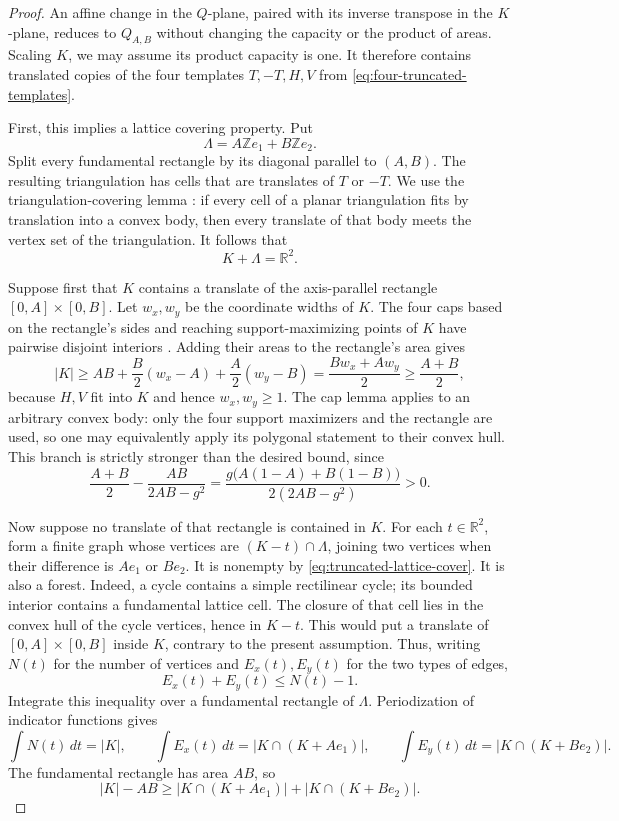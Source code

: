 \begin{proof}
An affine change in the $Q$-plane, paired with its inverse transpose in
the $K$-plane, reduces to $Q_{A,B}$ without changing the capacity or the
product of areas. Scaling $K$, we may assume its product capacity is one.
It therefore contains translated copies of the four templates
$T,-T,H,V$ from \eqref{eq:four-truncated-templates}.

First, this implies a lattice covering property. Put
\[
 \Lambda=A\mathbb Z e_1+B\mathbb Z e_2.
\]
Split every fundamental rectangle by its diagonal parallel to $(A,B)$.
The resulting triangulation has cells that are translates of $T$ or $-T$.
We use the triangulation-covering lemma
\cite[Lemma~4.3]{BMP2026}: if every cell of a planar triangulation fits by
translation into a convex body, then every translate of that body meets
the vertex set of the triangulation. It follows that
\begin{equation}\label{eq:truncated-lattice-cover}
 K+\Lambda=\mathbb R^2.
\end{equation}

Suppose first that $K$ contains a translate of the axis-parallel rectangle
$[0,A]\times[0,B]$. Let $w_x,w_y$ be the coordinate widths of $K$.
The four caps based on the rectangle's sides and reaching support-maximizing
points of $K$ have pairwise disjoint interiors
\cite[Lemma~7.1]{BMP2026}. Adding their areas to the rectangle's area gives
\[
 |K|\geq AB+\frac B2(w_x-A)+\frac A2(w_y-B)
       =\frac{Bw_x+Aw_y}{2}\geq\frac{A+B}{2},
\]
because $H,V$ fit into $K$ and hence $w_x,w_y\geq1$.
The cap lemma applies to an arbitrary convex body: only the four support
maximizers and the rectangle are used, so one may equivalently apply its
polygonal statement to their convex hull. This branch is strictly stronger
than the desired bound, since
\[
 \frac{A+B}{2}-\frac{AB}{2AB-g^2}
 =\frac{g\bigl(A(1-A)+B(1-B)\bigr)}{2(2AB-g^2)}>0.
\]

Now suppose no translate of that rectangle is contained in $K$.
For each $t\in\mathbb R^2$, form a finite graph whose vertices are
$(K-t)\cap\Lambda$, joining two vertices when their difference is
$Ae_1$ or $Be_2$. It is nonempty by \eqref{eq:truncated-lattice-cover}.
It is also a forest. Indeed, a cycle contains a simple rectilinear cycle;
its bounded interior contains a fundamental lattice cell. The closure of
that cell lies in the convex hull of the cycle vertices, hence in $K-t$.
This would put a translate of $[0,A]\times[0,B]$ inside $K$, contrary
to the present assumption. Thus, writing $N(t)$ for the number of vertices
and $E_x(t),E_y(t)$ for the two types of edges,
\[
 E_x(t)+E_y(t)\leq N(t)-1.
\]
Integrate this inequality over a fundamental rectangle of $\Lambda$.
Periodization of indicator functions gives
\[
 \int N(t)\,dt=|K|,\qquad
 \int E_x(t)\,dt=|K\cap(K+Ae_1)|,\qquad
 \int E_y(t)\,dt=|K\cap(K+Be_2)|.
\]
The fundamental rectangle has area $AB$, so
\begin{equation}\label{eq:forest-overlap}
 |K|-AB\geq |K\cap(K+Ae_1)|+|K\cap(K+Be_2)|.
\end{equation}


\end{proof}

